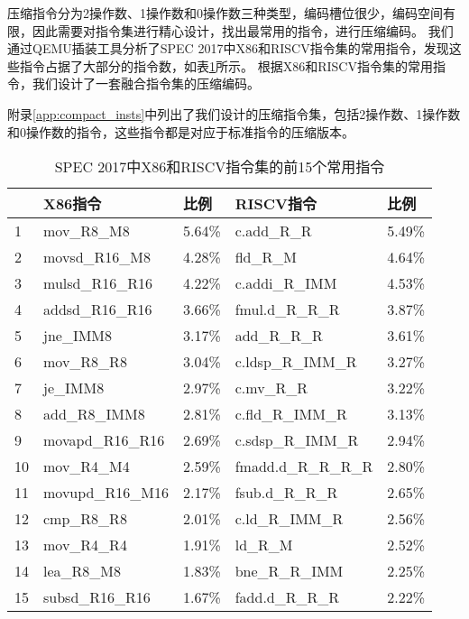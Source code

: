 压缩指令分为2操作数、1操作数和0操作数三种类型，编码槽位很少，编码空间有限，因此需要对指令集进行精心设计，找出最常用的指令，进行压缩编码。
我们通过QEMU插装工具分析了SPEC 2017中X86和RISCV指令集的常用指令，发现这些指令占据了大部分的指令数，如表\ref{tab:spec_insts}所示。
根据X86和RISCV指令集的常用指令，我们设计了一套融合指令集的压缩编码。

附录\ref{app:compact_insts}中列出了我们设计的压缩指令集，包括2操作数、1操作数和0操作数的指令，这些指令都是对应于标准指令的压缩版本。

\begin{table}[]
  \centering
  \caption{SPEC 2017中X86和RISCV指令集的前15个常用指令}
  \label{tab:spec_insts}
  \begin{tabular}{l|ll|ll}
     & X86指令            & 比例     & RISCV指令             & 比例     \\ \hline
  1  & mov\_R8\_M8      & 5.64\% & c.add\_R\_R         & 5.49\% \\
  2  & movsd\_R16\_M8   & 4.28\% & fld\_R\_M           & 4.64\% \\
  3  & mulsd\_R16\_R16  & 4.22\% & c.addi\_R\_IMM      & 4.53\% \\
  4  & addsd\_R16\_R16  & 3.66\% & fmul.d\_R\_R\_R     & 3.87\% \\
  5  & jne\_IMM8        & 3.17\% & add\_R\_R\_R        & 3.61\% \\
  6  & mov\_R8\_R8      & 3.04\% & c.ldsp\_R\_IMM\_R   & 3.27\% \\
  7  & je\_IMM8         & 2.97\% & c.mv\_R\_R          & 3.22\% \\
  8  & add\_R8\_IMM8    & 2.81\% & c.fld\_R\_IMM\_R    & 3.13\% \\
  9  & movapd\_R16\_R16 & 2.69\% & c.sdsp\_R\_IMM\_R   & 2.94\% \\
  10 & mov\_R4\_M4      & 2.59\% & fmadd.d\_R\_R\_R\_R & 2.80\% \\
  11 & movupd\_R16\_M16 & 2.17\% & fsub.d\_R\_R\_R     & 2.65\% \\
  12 & cmp\_R8\_R8      & 2.01\% & c.ld\_R\_IMM\_R     & 2.56\% \\
  13 & mov\_R4\_R4      & 1.91\% & ld\_R\_M            & 2.52\% \\
  14 & lea\_R8\_M8      & 1.83\% & bne\_R\_R\_IMM      & 2.25\% \\
  15 & subsd\_R16\_R16  & 1.67\% & fadd.d\_R\_R\_R     & 2.22\% \\
  \end{tabular}
  \end{table}



